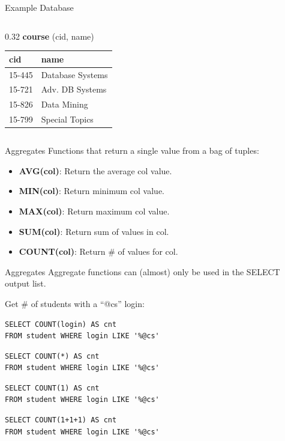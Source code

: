 \documentclass[aspectratio=169]{beamer}
\begin{document}
\begin{frame}[fragile]{Example Database}
\begin{columns}[t]
        \begin{column}{0.32\textwidth}
            \textbf{course} (cid, name)
            \begin{tabular}{|l|l|}
            \hline
            \textbf{cid} & \textbf{name} \\ \hline
            15-445 & Database Systems \\ \hline
            15-721 & Adv. DB Systems \\ \hline
            15-826 & Data Mining \\ \hline
            15-799 & Special Topics \\ \hline
            \end{tabular}
        \end{column}
    \end{columns}
\end{frame}

\begin{frame}{Aggregates}
    Functions that return a single value from a bag of tuples:
    \begin{itemize}
        \item \textbf{AVG(col)}: Return the average col value.
        \item \textbf{MIN(col)}: Return minimum col value.
        \item \textbf{MAX(col)}: Return maximum col value.
        \item \textbf{SUM(col)}: Return sum of values in col.
        \item \textbf{COUNT(col)}: Return \# of values for col.
    \end{itemize}
\end{frame}

\begin{frame}[fragile]{Aggregates}
    Aggregate functions can (almost) only be used in the SELECT output list.
    
    Get \# of students with a ``@cs'' login:
    
    \begin{lstlisting}
SELECT COUNT(login) AS cnt
FROM student WHERE login LIKE '%@cs'
    \end{lstlisting}
    
    \pause
    \begin{lstlisting}
SELECT COUNT(*) AS cnt
FROM student WHERE login LIKE '%@cs'
    \end{lstlisting}
    
    \pause
    \begin{lstlisting}
SELECT COUNT(1) AS cnt
FROM student WHERE login LIKE '%@cs'
    \end{lstlisting}
    
    \pause
    \begin{lstlisting}
SELECT COUNT(1+1+1) AS cnt
FROM student WHERE login LIKE '%@cs'
    \end{lstlisting}
\end{frame}
\end{document}
